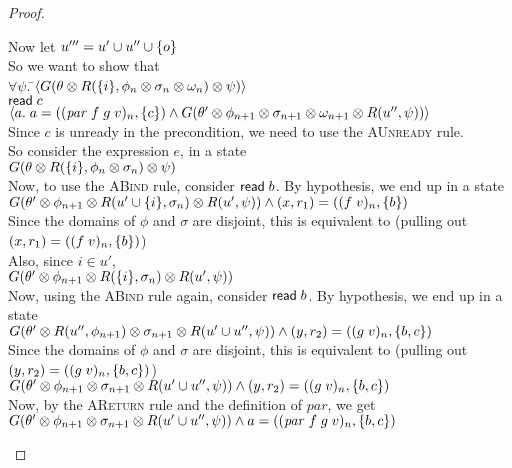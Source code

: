 \begin{proof}
\begin{tabbedproof}
\oo Now let $u''' = u' \cup u'' \cup \{{o}\}$ \\
\oo So we want to show that \\
\oo $\forall \psi.\;$\=$\left<G(\theta \otimes R(\{{i}\},\phi_n \otimes \sigma_n \otimes \omega_n) \otimes \psi)\right>$ \\
\oo \> ${\mathsf{read}\; c}$ \\
\oo \> $\left<{a.\;a = ((\mathit{par}\;f\;g\;v)_n, \{{c}\}) \land G(\theta' \otimes \phi_{n+1} \otimes \sigma_{n+1} \otimes \omega_{n+1} \otimes R(u'', \psi))}\right>$ \\
\oo Since $c$ is unready in the precondition, we need to use the \textsc{AUnready} rule. \\
\oo So consider the expression $e$, in a state \\
\oo $G(\theta \otimes R(\{{i}\},\phi_n \otimes \sigma_n) \otimes \psi)$ \\
\oo Now, to use the \textsc{ABind} rule, consider  $\mathsf{read}\; b$. By hypothesis, we end up in a state \\
\oo $G(\theta' \otimes \phi_{n+1} \otimes R(u' \cup \{{i}\},\sigma_n) \otimes R(u', \psi)) \land (x,r_1) = ((f\;v)_n, \{{b}\})$ \\
\oo Since the domains of $\phi$ and $\sigma$ are disjoint, this is equivalent to (pulling out $(x,r_1) = ((f\;v)_n, \{{b}\})$) \\
\oo Also, since $i \in u'$, \\
\oo $G(\theta' \otimes \phi_{n+1} \otimes R(\{{i}\},\sigma_n) \otimes R(u', \psi))$ \\
\oo Now, using the \textsc{ABind} rule again, consider $\mathsf{read}\; b$. By hypothesis, we end up in a state \\
\oo $G(\theta' \otimes R(u'',\phi_{n+1}) \otimes \sigma_{n+1} \otimes R(u' \cup u'', \psi)) \land (y,r_2) = ((g\;v)_n, \{{b, c}\})$ \\
\oo Since the domains of $\phi$ and $\sigma$ are disjoint, this is equivalent to (pulling out $(y,r_2) = ((g\;v)_n, \{{b, c}\})$) \\
\oo $G(\theta' \otimes \phi_{n+1} \otimes \sigma_{n+1} \otimes R(u' \cup u'', \psi)) \land (y, r_2) = ((g\;v)_n, \{{b,c}\})$ \\
\oo Now, by the \textsc{AReturn} rule and the definition of $\mathit{par}$, we get \\
\oo $G(\theta' \otimes \phi_{n+1} \otimes \sigma_{n+1} \otimes R(u' \cup u'', \psi)) \land a = ((\mathit{par}\;f\;g\;v)_n, \{{b,c}\})$ \\

\end{tabbedproof}
\end{proof}
